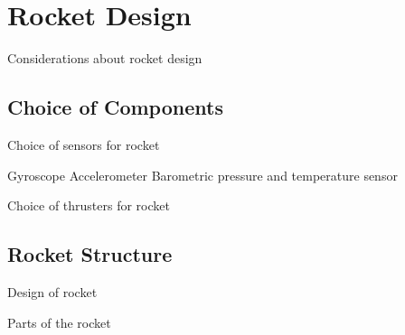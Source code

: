 
\chapter{Rocket Design}

Considerations about rocket design

\section{Choice of Components}
Choice of sensors for rocket

Gyroscope
Accelerometer
Barometric pressure and temperature sensor


Choice of thrusters for rocket

\section{Rocket Structure}
Design of rocket

Parts of the rocket 


